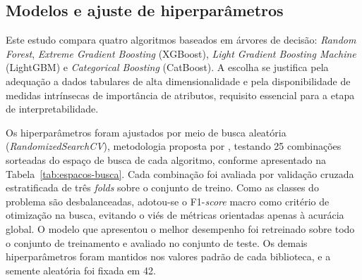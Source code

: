 \subsection{Modelos e ajuste de hiperparâmetros}

Este estudo compara quatro algoritmos baseados em árvores de decisão: \textit{Random Forest}, \textit{Extreme Gradient Boosting} (XGBoost), \textit{Light Gradient Boosting Machine} (LightGBM) e \textit{Categorical Boosting} (CatBoost). A escolha se justifica pela adequação a dados tabulares de alta dimensionalidade e pela disponibilidade de medidas intrínsecas de importância de atributos, requisito essencial para a etapa de interpretabilidade.

Os hiperparâmetros foram ajustados por meio de busca aleatória (\textit{RandomizedSearchCV}), metodologia proposta por , testando 25 combinações sorteadas do espaço de busca de cada algoritmo, conforme apresentado na Tabela~\ref{tab:espacos-busca}. Cada combinação foi avaliada por validação cruzada estratificada de três \textit{folds} sobre o conjunto de treino. Como as classes do problema são desbalanceadas, adotou-se o F1-\textit{score} macro como critério de otimização na busca, evitando o viés de métricas orientadas apenas à acurácia global. O modelo que apresentou o melhor desempenho foi retreinado sobre todo o conjunto de treinamento e avaliado no conjunto de teste. Os demais hiperparâmetros foram mantidos nos valores padrão de cada biblioteca, e a semente aleatória foi fixada em 42.

